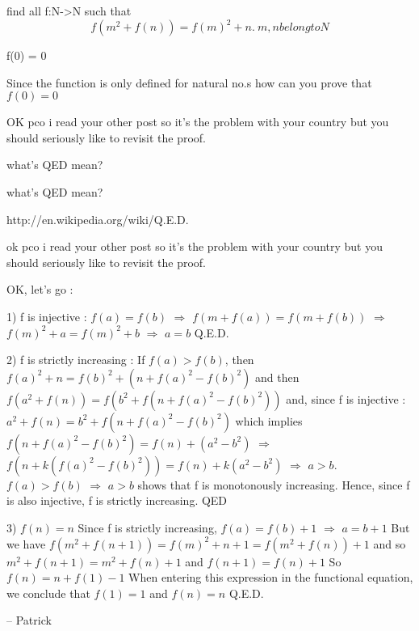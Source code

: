 \begin{mysolution}
	\begin{tcolorbox}find all f:N->N such that
\[f(m^{2}+f(n))=f(m)^{2}+n.\ m,n belong to N \]
\end{tcolorbox}
\begin{tcolorbox}f(0) = 0 
\end{tcolorbox}
Since the function is only defined for natural no.s how can you prove that $f(0)=0$ 

OK pco i read your other post   so it's the problem with your country but you should seriously like to revisit the proof.
\end{mysolution}



\begin{mysolution}
	what's QED mean?
\end{mysolution}



\begin{mysolution}
	\begin{tcolorbox}what's QED mean?\end{tcolorbox}

http://en.wikipedia.org/wiki/Q.E.D. 
\end{mysolution}



\begin{mysolution}
	\begin{tcolorbox}ok pco i read your other post   so it's the problem with your country but you should seriously like to revisit the proof.\end{tcolorbox}

OK, let's go :

1) f is injective :
$f(a)=f(b)$ $\Rightarrow $ $f(m+f(a))=f(m+f(b))$ $\Rightarrow $ $f(m)^{2}+a=f(m)^{2}+b$ $\Rightarrow $ $a=b$ Q.E.D.

2) f is strictly increasing :
If $f(a)>f(b)$, then $f(a)^{2}+n=f(b)^{2}+(n+f(a)^{2}-f(b)^{2})$ and then $f(a^{2}+f(n))=f(b^{2}+f(n+f(a)^{2}-f(b)^{2}))$ and, since f is injective :
$a^{2}+f(n)=b^{2}+f(n+f(a)^{2}-f(b)^{2})$ which implies $f(n+f(a)^{2}-f(b)^{2})=f(n)+(a^{2}-b^{2})$
$\Rightarrow $  $f(n+k(f(a)^{2}-f(b)^{2}))=f(n)+k(a^{2}-b^{2})$ $\Rightarrow $ $a>b$.
$f(a)>f(b)$ $\Rightarrow $ $a>b$ shows that f is monotonously increasing. Hence, since f is also injective, f is strictly increasing. QED

3) $f(n)=n$
Since f is strictly increasing, $f(a)=f(b)+1$ $\Rightarrow $ $a=b+1$
But we have $f(m^{2}+f(n+1))=f(m)^{2}+n+1 = f(m^{2}+f(n))+1$ and so $m^{2}+f(n+1)=m^{2}+f(n)+1$ and $f(n+1)=f(n)+1$
So $f(n)=n+f(1)-1$
When entering this expression in the functional equation, we conclude that $f(1)=1$ and $f(n)=n$
Q.E.D.


-- 
Patrick
\end{mysolution}



